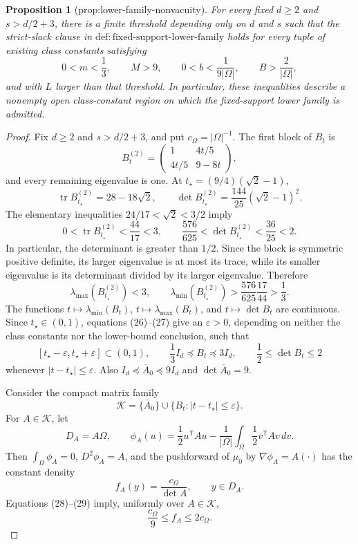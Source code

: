 \documentclass{article}
\newtheorem{proposition}{Proposition}
\begin{document}
\begin{proposition}[prop:lower-family-nonvacuity]\label{prop:lower-family-nonvacuity}
For every fixed \(d\ge2\) and \(s>d/2+3\), there is a finite threshold depending only on \(d\) and \(s\) such that the strict-slack clause in \(\mathrm{def:fixed\text{-}support\text{-}lower\text{-}family}\) holds for every tuple of existing class constants satisfying
\[
 0<m<\frac13,\qquad M>9,\qquad
 0<b<\frac{1}{9\lvert\Omega\rvert},\qquad
 B>\frac{2}{\lvert\Omega\rvert},
\]
and with \(L\) larger than that threshold.  In particular, these inequalities describe a nonempty open class-constant region on which the fixed-support lower family is admitted.
\end{proposition}
\begin{proof}
Fix \(d\ge2\) and \(s>d/2+3\), and put \(c_\Omega=\lvert\Omega\rvert^{-1}\).  The first block of \(B_t\) is
\[
 B_t^{(2)}=
 \begin{pmatrix}1&4t/5\\4t/5&9-8t\end{pmatrix},
\]
and every remaining eigenvalue is one.  At \(t_\star=(9/4)(\sqrt2-1)\),
\[
 \operatorname{tr}B_{t_\star}^{(2)}=28-18\sqrt2,
 \qquad
 \det B_{t_\star}^{(2)}
 =\frac{144}{25}(\sqrt2-1)^2.
 \tag{26}
\]
The elementary inequalities \(24/17<\sqrt2<3/2\) imply
\[
 0<\operatorname{tr}B_{t_\star}^{(2)}<\frac{44}{17}<3,
 \qquad
 \frac{576}{625}<\det B_{t_\star}^{(2)}<\frac{36}{25}<2.
\]
In particular, the determinant is greater than \(1/2\).  Since the block is symmetric positive definite, its larger eigenvalue is at most its trace, while its smaller eigenvalue is its determinant divided by its larger eigenvalue.  Therefore
\[
 \lambda_{\max}(B_{t_\star}^{(2)})<3,
 \qquad
 \lambda_{\min}(B_{t_\star}^{(2)})
 >\frac{576}{625}\frac{17}{44}>\frac13.
 \tag{27}
\]
The functions \(t\mapsto\lambda_{\min}(B_t)\), \(t\mapsto\lambda_{\max}(B_t)\), and \(t\mapsto\det B_t\) are continuous.  Since \(t_\star\in(0,1)\), equations (26)--(27) give an \(\varepsilon>0\), depending on neither the class constants nor the lower-bound conclusion, such that
\[
 [t_\star-\varepsilon,t_\star+\varepsilon]\subset(0,1),
 \qquad
 \frac13 I_d\preceq B_t\preceq3I_d,
 \qquad
 \frac12\le\det B_t\le2
 \tag{28}
\]
whenever \(\lvert t-t_\star\rvert\le\varepsilon\).  Also \(I_d\preceq\overline A_0\preceq9I_d\) and \(\det\overline A_0=9\).

Consider the compact matrix family
\[
 \mathcal K=\{\overline A_0\}\cup
 \{B_t:\lvert t-t_\star\rvert\le\varepsilon\}.
\]
For \(A\in\mathcal K\), let
\[
 D_A=A\Omega,
 \qquad
 \phi_A(u)=\frac12u^{\mathsf T}Au
 -\frac{1}{\lvert\Omega\rvert}\int_\Omega\frac12v^{\mathsf T}Av\,dv.
\]
Then \(\int_\Omega\phi_A=0\), \(D^2\phi_A=A\), and the pushforward of \(\mu_0\) by \(\nabla\phi_A=A(\cdot)\) has the constant density
\[
 f_A(y)=\frac{c_\Omega}{\det A},\qquad y\in D_A.
 \tag{29}
\]
Equations (28)--(29) imply, uniformly over \(A\in\mathcal K\),
\[
 \frac{c_\Omega}{9}\le f_A\le2c_\Omega.
 \tag{30}
\]


\end{proof}
\end{document}
